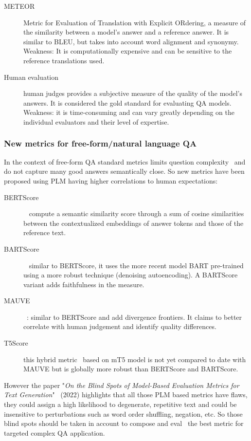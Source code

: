 \documentclass[acmsmall]{acmart}
\begin{document}
\begin{description}
\item [METEOR] Metric for Evaluation of Translation with Explicit ORdering, a measure of the similarity between a model's answer and a reference answer. It is similar to BLEU, but takes into account word alignment and synonymy. Weakness: It is computationally expensive and can be sensitive to the reference translations used.
\item [Human evaluation] human judges provides a subjective measure of the quality of the model's answers. It is considered the gold standard for evaluating QA models. Weakness: it is time-consuming and can vary greatly depending on the individual evaluators and their level of expertise.
\end{description}

\subsubsection{New metrics for free-form/natural language QA}
In the context of free-form QA standard metrics limits question complexity~\citep{chenEvaluatingQuestionAnswering2019} and do not capture many good answers semantically close. So new metrics have been proposed using PLM having higher correlations to human expectations:
\begin{description}
\item [BERTScore]~\citep{zhangBERTScoreEvaluatingText2020} compute a semantic similarity score through a sum of cosine similarities between the contextualized embeddings of answer tokens and those of the reference text.
\item [BARTScore]~\citep{yuanBARTScoreEvaluatingGenerated2021} similar to BERTScore, it uses the more recent model BART pre-trained using a more robust technique (denoising autoencoding). A BARTScore variant adds faithfulness in the measure.
\item [MAUVE]~\citep{pillutlaMAUVEMeasuringGap2021}: similar to BERTScore and add divergence frontiers. It claims to better correlate with human judgement and identify quality differences.
\item [T5Score] this hybrid metric~\citep{qinT5ScoreDiscriminativeFinetuning2022} based on mT5 model is not yet compared to date with MAUVE but is globally more robust than BERTScore and BARTScore.
\end{description}

However the paper "\textit{On the Blind Spots of Model-Based Evaluation Metrics for Text Generation}"~\citep{heBlindSpotsModelBased2022} (2022) highlights that all those PLM based metrics have flaws, they could assign a high likelihood to degenerate, repetitive text and could be insensitive to perturbations such as word order shuffling, negation, etc. So those blind spots should be taken in account to compose and eval~\citep{frisoniNLGMetricverseEndtoEndLibrary2022} the best metric for targeted complex QA application.
\end{document}
